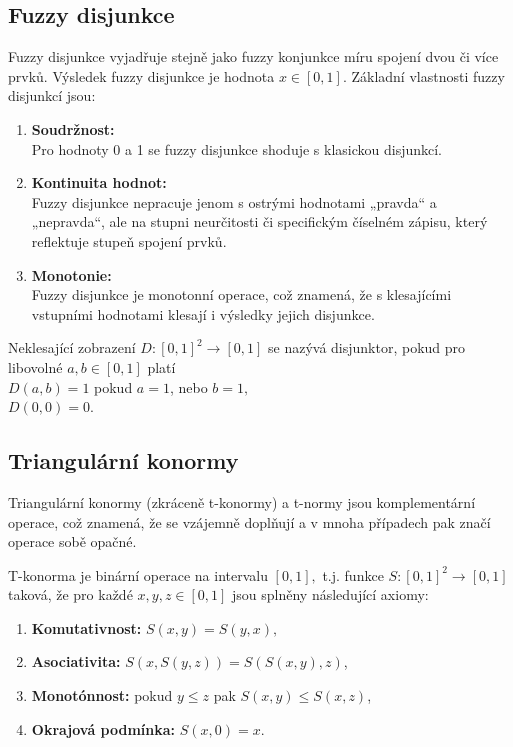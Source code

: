 \subsection{Fuzzy disjunkce} 
Fuzzy disjunkce vyjadřuje stejně jako fuzzy konjunkce míru spojení dvou či více prvk\r u. Výsledek fuzzy disjunkce je hodnota $x \in [0,1].$ 
Základní vlastnosti fuzzy disjunkcí jsou:
\begin{enumerate}
    \item \textbf{Soudržnost:}\\
    Pro hodnoty 0 a 1 se fuzzy disjunkce shoduje s klasickou disjunkcí.
    \item \textbf{Kontinuita hodnot:}\\
    Fuzzy disjunkce nepracuje jenom s  ostrými hodnotami „pravda“ a „nepravda“, ale na stupni neurčitosti či specifickým číselném zápisu, který reflektuje stupeň spojení prvk\r u.
   \item \textbf{Monotonie:}\\
    Fuzzy disjunkce je monotonní operace, což znamená, že s klesajícími vstupními hodnotami klesají i výsledky jejich disjunkce.
\end{enumerate}

\begin{definition}
    \cite{Kolo}
    Neklesající zobrazení $D: [0,1]^2 \rightarrow [0,1]$ se nazývá disjunktor, pokud pro libovolné $a, b \in [0,1]$ platí\\ $D(a,b) = 1$ pokud  $a = 1$, nebo  $b = 1,$\\
    $D(0,0) = 0.$
\end{definition}


\subsection{Triangul\'arn\'i konormy} 
\label{sec: Triangulární konormy}
Triangulární konormy (zkráceně t-konormy) a t-normy jsou komplementární operace, což znamená, že se vzájemně dopl\v nují a v mnoha případech pak značí operace sobě opačné.
\begin{definition}
    T-konorma je binární operace na intervalu $[0,1],$ t.j. funkce $S: [0,1]^2 \rightarrow [0,1]$ taková, že pro každé $x, y, z \in [0,1]$ jsou splněny následující axiomy:
    \begin{enumerate}
        \item \textbf{Komutativnost: } $S(x,y) = S(y,x),$
        \item \textbf{Asociativita: } $S(x,S(y,z)) = S(S(x,y),z)$,
        \item \textbf{Monotónnost:} pokud $y \leq z$ pak $S(x, y) \leq S(x, z)$,
        \item \textbf{Okrajová podmínka: } $S(x,0) = x.$
    \end{enumerate}
\end{definition}


